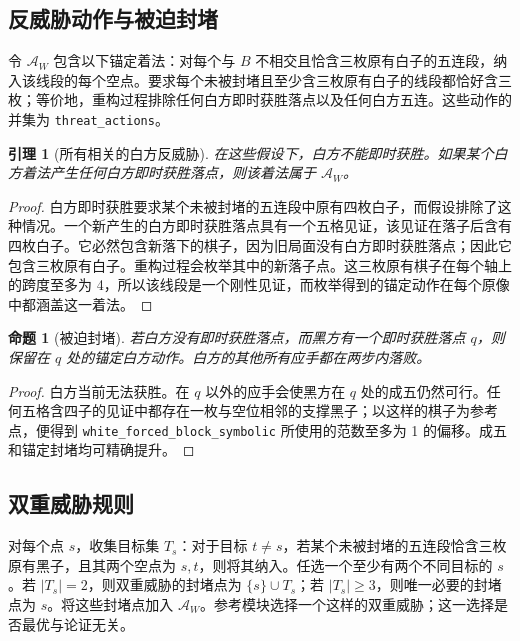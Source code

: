 \documentclass[11pt]{article}
\newtheorem{lemma}[theorem]{引理}
\newtheorem{proposition}[theorem]{命题}
\theoremstyle{definition}
\theoremstyle{remark}
\begin{document}
\subsection{反威胁动作与被迫封堵}

令 \(\mathcal A_W\) 包含以下锚定着法：对每个与 \(B\) 不相交且恰含三枚原有白子的五连段，纳入该线段的每个空点。要求每个未被封堵且至少含三枚原有白子的线段都恰好含三枚；等价地，重构过程排除任何白方即时获胜落点以及任何白方五连。这些动作的并集为 \texttt{threat\_actions}。

\begin{lemma}[所有相关的白方反威胁]\label{mac:counter-actions}
在这些假设下，白方不能即时获胜。如果某个白方着法产生任何白方即时获胜落点，则该着法属于 \(\mathcal A_W\)。

\end{lemma}
\begin{proof}
白方即时获胜要求某个未被封堵的五连段中原有四枚白子，而假设排除了这种情况。一个新产生的白方即时获胜落点具有一个五格见证，该见证在落子后含有四枚白子。它必然包含新落下的棋子，因为旧局面没有白方即时获胜落点；因此它包含三枚原有白子。重构过程会枚举其中的新落子点。这三枚原有棋子在每个轴上的跨度至多为 4，所以该线段是一个刚性见证，而枚举得到的锚定动作在每个原像中都涵盖这一着法。
\end{proof}

\begin{proposition}[被迫封堵]\label{mac:forced-block}
若白方没有即时获胜落点，而黑方有一个即时获胜落点 \(q\)，则保留在 \(q\) 处的锚定白方动作。白方的其他所有应手都在两步内落败。

\end{proposition}
\begin{proof}
白方当前无法获胜。在 \(q\) 以外的应手会使黑方在 \(q\) 处的成五仍然可行。任何五格含四子的见证中都存在一枚与空位相邻的支撑黑子；以这样的棋子为参考点，便得到 \texttt{white\_\allowbreak{}forced\_\allowbreak{}block\_\allowbreak{}symbolic} 所使用的范数至多为 1 的偏移。成五和锚定封堵均可精确提升。
\end{proof}

\subsection{双重威胁规则}

对每个点 \(s\)，收集目标集 \(T_s\)：对于目标 \(t\ne s\)，若某个未被封堵的五连段恰含三枚原有黑子，且其两个空点为 \(s,t\)，则将其纳入。任选一个至少有两个不同目标的 \(s\)。若 \(|T_s|=2\)，则双重威胁的封堵点为 \(\{s\}\cup T_s\)；若 \(|T_s|\ge3\)，则唯一必要的封堵点为 \(s\)。将这些封堵点加入 \(\mathcal A_W\)。参考模块选择一个这样的双重威胁；这一选择是否最优与论证无关。
\end{document}
